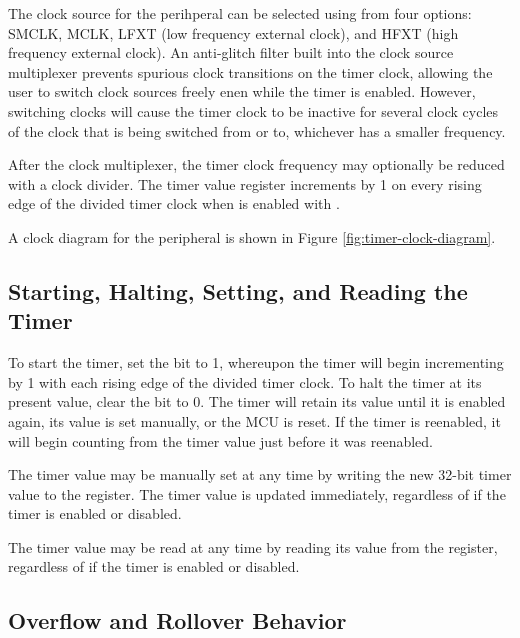 The clock source for the  perihperal can be selected using  from four options: SMCLK, MCLK, LFXT (low frequency external clock), and HFXT (high frequency external clock). An anti-glitch filter built into the clock source multiplexer prevents spurious clock transitions on the timer clock, allowing the user to switch clock sources freely enen while the timer is enabled. However, switching clocks will cause the timer clock to be inactive for several clock cycles of the clock that is being switched from or to, whichever has a smaller frequency.

After the clock multiplexer, the timer clock frequency may optionally be reduced with a clock divider. The timer value register  increments by 1 on every rising edge of the divided timer clock when  is enabled with .

A clock diagram for the  peripheral is shown in Figure \ref{fig:timer-clock-diagram}.



\subsection{Starting, Halting, Setting, and Reading the Timer}

To start the timer, set the  bit to 1, whereupon the timer will begin incrementing by 1 with each rising edge of the divided timer clock. To halt the timer at its present value, clear the  bit to 0. The timer will retain its value until it is enabled again, its value is set manually, or the MCU is reset. If the timer is reenabled, it will begin counting from the timer value just before it was reenabled.

The timer value may be manually set at any time by writing the new 32-bit timer value to the  register. The timer value is updated immediately, regardless of if the timer is enabled or disabled.

The timer value may be read at any time by reading its value from the  register, regardless of if the timer is enabled or disabled.



\subsection{Overflow and Rollover Behavior}

